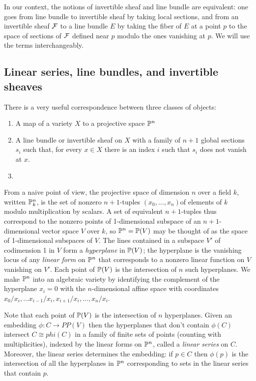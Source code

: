  In our context, the notions of invertible sheaf and line bundle are equivalent: one goes from line bundle to invertible sheaf by taking local sections, and from an invertible sheaf $\cF$ to a line bundle $E$ by taking the fiber of 
 $E$ at a point $p$ to the space of sections of $\cF$ defined near $p$ modulo the ones vanishing at $p$. We will use the terms interchangeably. 
 





\subsection{Linear series, line bundles, and invertible sheaves}\label{linear series 1}

There is a very useful correspondence between three classes of objects:
\begin{enumerate}
\item A map of a variety $X$ to a projective space $\PP^n $
\item A line bundle or invertible sheaf on $X$ with a family of $n+1$ global sections $s_i$ such that, for every $x\in X$ there is an index $i$ such that $s_i$ does not vanish at $x$.
\item
\end{enumerate}

From a naive point of view, the projective space of dimension $n$ over a field $k$, written  $\PP^n_k$, is the set of nonzero $n+1$-tuples $(x_0,\dots, x_n)$of elements of $k$ modulo multiplication by scalars. A set of equivalent $n+1$-tuples thus correspond to the nonzero points of 1-dimensional subspace of an $n+1$-dimensional vector space $V$ over $k$, so
 $\PP^{n} = \PP(V)$ may be thought of as the space of 1-dimensional subspaces of $V$. The lines contained in a subspace  $V'$ of codimension 1 in $V$ form a \emph{hyperplane} in $\PP(V)$; the hyperplane is the vanishing locus of any \emph{linear form} on $\PP^n$ that corresponds to a nonzero linear function on $V$ vanishing on $V'$. Each point of $\PP(V)$ is the intersection of $n$ such hyperplanes. We make $\PP^n$ into an algebraic variety by identifying the complement of the hyperplane $x_i=0$ with the $n$-dimensional affine space with coordinates $x_0/x_i,\dots x_{i-1}/x_i, x_{i+1}/x_i,\dots,x_n/x_i$. 
 
Note that each point of $\PP(V)$ is the intersection of $n$ hyperplanes. 
Given an embedding $\phi: C \to PP(V)$ then the hyperplanes that don't contain $\phi(C)$ intersect $C\cong phi(C)$ in a family of finite sets of points (counting with multiplicities), indexed by the linear forms on $\PP^n$, called a \emph{linear series} on $C$. Moreover, the linear series determines the embedding: if $p\in C$ then $\phi(p)$ is the intersection of all the hyperplanes in $\PP^n$ corresponding to sets in the linear series that contain $p$.
 
